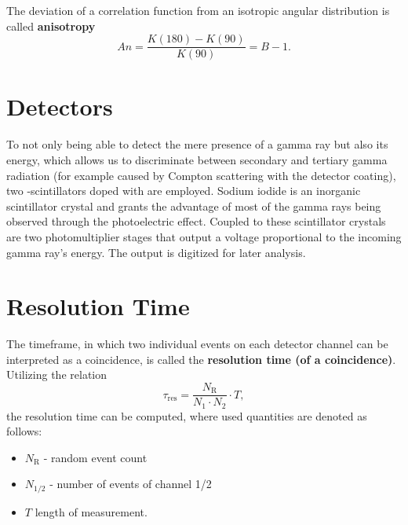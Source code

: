 The deviation of a correlation function from an isotropic angular distribution is called \textbf{anisotropy}
\begin{equation}\label{eq:aniso}
	An=\frac{K(180)-K(90)}{K(90)}=B-1.
\end{equation}

\section{Detectors}\label{sec:detectors}
To not only being able to detect the mere presence of a gamma ray but also its energy, which allows us to discriminate between secondary and tertiary gamma radiation (for example caused by Compton scattering with the detector coating), two -scintillators doped with  are employed.
Sodium iodide is an inorganic scintillator crystal and grants the advantage of most of the gamma rays being observed through the photoelectric effect.
Coupled to these scintillator crystals are two photomultiplier stages that output a voltage proportional to the incoming gamma ray's energy. 
The output is digitized for later analysis.

\section{Resolution Time}
The timeframe, in which two individual events on each detector channel can be interpreted as a coincidence, is called the \textbf{resolution time (of a coincidence)}.
Utilizing the relation
\begin{equation}\label{eq:res_time}
	\tau_\text{res}=\frac{N_\text{R}}{N_1\cdot N_2}\cdot T,
\end{equation}
the resolution time can be computed, where used quantities are denoted as follows:
\begin{itemize}
	\item $N_\text{R}$ - random event count
	\item $N_{1/2}$ - number of events of channel 1/2
	\item $T$ length of measurement.
\end{itemize}
